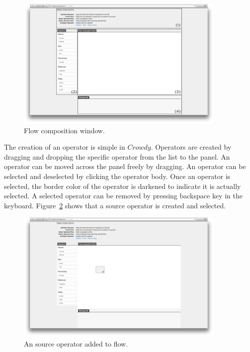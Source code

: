 \begin{figure}[ht]
	\centering
	\includegraphics[width=0.9\textwidth]{figures/tool/panel1.png}
	\caption{Flow composition window.}
	\label{fig:panel1}
\end{figure}

The creation of an operator is simple in $Crowdy$. Operators are created by dragging and 
dropping the specific operator from the list to the panel. An operator can be moved across 
the panel freely by dragging. An operator can be selected and deselected by clicking the 
operator body. Once an operator is selected, the border color of the operator is darkened 
to indicate it is actually selected. A selected operator can be removed by 
pressing backspace key in the keyboard. Figure~\ref{fig:panel2} shows that a source 
operator is created and selected.

\begin{figure}[ht]
	\centering
	\includegraphics[width=0.9\textwidth]{figures/tool/panel2.png}
	\caption{An source operator added to flow.}
	\label{fig:panel2}
\end{figure}

